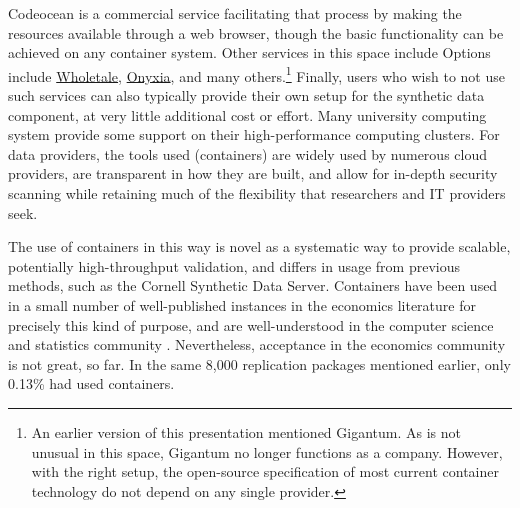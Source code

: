 \documentclass{article}
\begin{document}
Codeocean is a commercial service facilitating that process by making the resources available through a web browser, though the basic functionality can be achieved on any container system. Other services in this space include Options include \href{https://wholetale.org}{Wholetale}, \href{https://www.onyxia.sh/}{Onyxia}, and many others.\footnote{An earlier version of this presentation mentioned Gigantum. As is not unusual in this space, Gigantum no longer functions as a company. However, with the right setup, the open-source specification of most current container technology do not depend on any single provider.} Finally, users who wish to not use such services can also typically provide their own setup for the synthetic data component, at very little additional cost or effort. Many university computing system provide some support on their high-performance computing clusters. For data providers, the tools used (containers) are widely used by numerous cloud providers, are transparent in how they are built, and allow for in-depth security scanning while retaining much of the flexibility that researchers and IT providers seek.

The use of containers in this way is novel as a systematic way to provide scalable, potentially high-throughput validation, and differs in usage from previous methods, such as the Cornell Synthetic Data Server. Containers have been used in a small number of well-published instances in the economics literature for precisely this kind of purpose, and are well-understood in the computer science and statistics community \citep{boettiger_introduction_2015,moreau_containers_2023}. Nevertheless, acceptance in the economics community is not great, so far. In the same 8,000 replication packages mentioned earlier, only 0.13\% had used containers. 



\end{document}

